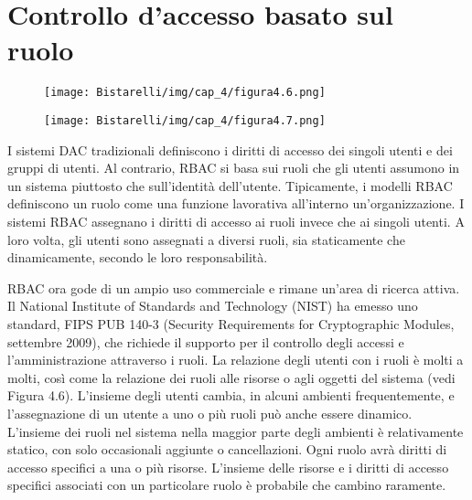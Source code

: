 \section{Controllo d'accesso basato sul ruolo}

\begin{figure}[H]
	\centering
    \texttt{[image: Bistarelli/img/cap\_4/figura4.6.png]}
\end{figure}

\begin{figure}[H]
	\centering
    \texttt{[image: Bistarelli/img/cap\_4/figura4.7.png]}
\end{figure}


I sistemi DAC tradizionali definiscono i diritti di accesso dei singoli utenti e dei gruppi di utenti. Al contrario, RBAC si basa sui ruoli che gli utenti assumono in un sistema piuttosto che sull'identità dell'utente. Tipicamente, i modelli RBAC definiscono un ruolo come una funzione lavorativa all'interno un'organizzazione. I sistemi RBAC assegnano i diritti di accesso ai ruoli invece che ai singoli utenti. A loro volta, gli utenti sono assegnati a diversi ruoli, sia staticamente che dinamicamente, secondo le loro responsabilità.

\singlespacing

RBAC ora gode di un ampio uso commerciale e rimane un'area di ricerca attiva. Il National Institute of Standards and Technology (NIST) ha emesso uno standard, FIPS PUB 140-3 (Security Requirements for Cryptographic Modules, settembre 2009), che richiede il supporto per il controllo degli accessi e l'amministrazione attraverso i ruoli. La relazione degli utenti con i ruoli è molti a molti, così come la relazione dei ruoli alle risorse o agli oggetti del sistema (vedi Figura 4.6). L'insieme degli utenti cambia, in alcuni ambienti frequentemente, e l'assegnazione di un utente a uno o più ruoli può anche essere dinamico. L'insieme dei ruoli nel sistema nella maggior parte degli ambienti è relativamente statico, con solo occasionali aggiunte o cancellazioni. Ogni ruolo avrà diritti di accesso specifici a una o più risorse. L'insieme delle risorse e i diritti di accesso specifici associati con un particolare ruolo è probabile che cambino raramente.

\singlespacing

